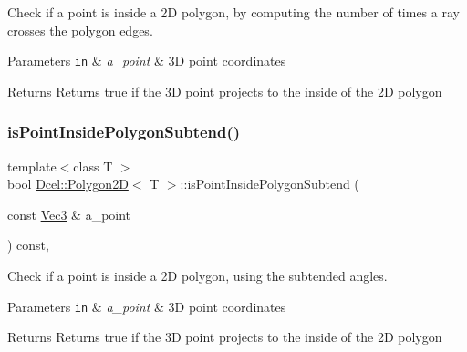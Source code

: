 Check if a point is inside a 2D polygon, by computing the number of times a ray crosses the polygon edges. 


\begin{DoxyParams}[1]{Parameters}
\mbox{\tt in}  & {\em a\+\_\+point} & 3D point coordinates \\
\hline
\end{DoxyParams}
\begin{DoxyReturn}{Returns}
Returns true if the 3D point projects to the inside of the 2D polygon 
\end{DoxyReturn}
\mbox{\label{classDcel_1_1Polygon2D_a8a6a32defe11ad15996e286aa76d4428}} 
\subsubsection{\texorpdfstring{is\+Point\+Inside\+Polygon\+Subtend()}{isPointInsidePolygonSubtend()}}
{\footnotesize\ttfamily template$<$class T $>$ \\
bool \hyperlink{classDcel_1_1Polygon2D}{Dcel\+::\+Polygon2D}$<$ T $>$\+::is\+Point\+Inside\+Polygon\+Subtend (\begin{DoxyParamCaption}\item[{const \hyperlink{classDcel_1_1Polygon2D_a46e9686210f09464e8f5ad13300717b9}{Vec3} \&}]{a\+\_\+point }\end{DoxyParamCaption}) const\hspace{0.3cm}{\ttfamily [inline]}, {\ttfamily [noexcept]}}



Check if a point is inside a 2D polygon, using the subtended angles. 


\begin{DoxyParams}[1]{Parameters}
\mbox{\tt in}  & {\em a\+\_\+point} & 3D point coordinates \\
\hline
\end{DoxyParams}
\begin{DoxyReturn}{Returns}
Returns true if the 3D point projects to the inside of the 2D polygon 
\end{DoxyReturn}
\mbox{\label{classDcel_1_1Polygon2D_ad4d6b51a54f6a9c89812a5bcbc0e1902}} 
